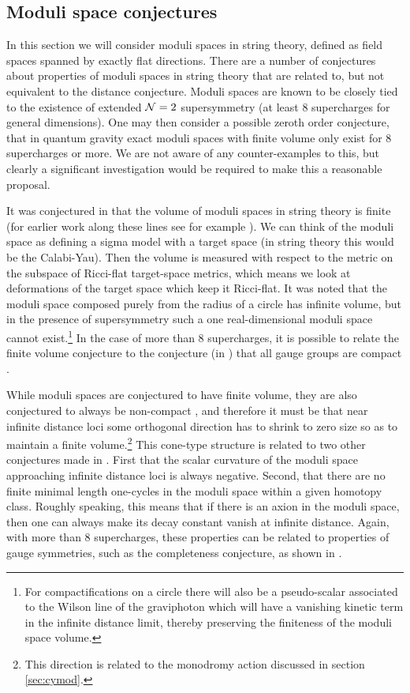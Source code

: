 \documentclass[11pt,a4paper]{article}
\numberwithin{equation}{section}
\numberwithin{table}{section}\setlength{\multlinegap}{25pt}
\begin{document}
{\subsection{Moduli space conjectures}
\label{sec:modsp}

In this section we will consider moduli spaces in string theory, defined as field spaces spanned by exactly flat directions. There are a number of conjectures about properties of moduli spaces in string theory that are related to, but not equivalent to the distance conjecture. Moduli spaces are known to be closely tied to the existence of extended ${\cal N}=2$ supersymmetry (at least 8 supercharges for general dimensions). One may then consider a possible zeroth order conjecture, that in quantum gravity exact moduli spaces with finite volume only exist for 8 supercharges or more. We are not aware of any counter-examples to this, but clearly a significant investigation would be required to make this a reasonable proposal.  

It was conjectured in \cite{DouglasStrings2005} that the volume of moduli spaces in string theory is finite (for earlier work along these lines see  for example \cite{Horne:1994mi}). We can think of the moduli space as defining a sigma model with a target space (in string theory this would be the Calabi-Yau). Then the volume is measured with respect to the metric on the subspace of Ricci-flat target-space metrics, which means we look at deformations of the target space which keep it Ricci-flat. It was noted that the moduli space composed purely from the radius of a circle has infinite volume, but in the presence of supersymmetry such a one real-dimensional moduli space cannot exist.\footnote{For compactifications on a circle there will also be a pseudo-scalar associated to the Wilson line of the graviphoton which will have a vanishing kinetic term in the infinite distance limit, thereby preserving the finiteness of the moduli space volume.} In the case of more than 8 supercharges, it is possible to relate the finite volume conjecture to the conjecture (in \cite{Banks:2010zn}) that all gauge groups are compact \cite{Cecotti:2015wqa}. 

While moduli spaces are conjectured to have finite volume, they are also conjectured to always be non-compact \cite{Ooguri:2006in}, and therefore it must be that near infinite distance loci some orthogonal direction has to shrink to zero size so as to maintain a finite volume.\footnote{This direction is related to the monodromy action discussed in section \ref{sec:cymod}.} This cone-type structure is related to two other conjectures made in \cite{Ooguri:2006in}. First that the scalar curvature of the moduli space approaching infinite distance loci is always negative. Second, that there are no finite minimal length one-cycles in the moduli space within a given homotopy class. Roughly speaking, this means that if there is an axion in the moduli space, then one can always make its decay constant vanish at infinite distance. Again, with more than 8 supercharges, these properties can be related to properties of gauge symmetries, such as the completeness conjecture, as shown in \cite{Cecotti:2015wqa}. 

}
\end{document}
